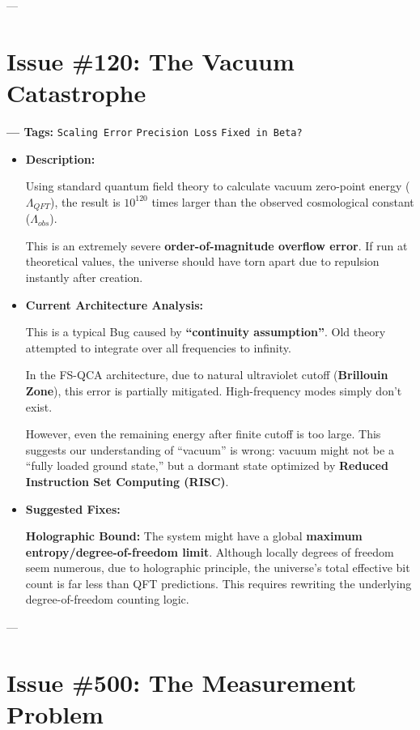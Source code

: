 \documentclass[11pt,a4paper,twoside]{book}
\begin{document}
---

\section{Issue \#120: The Vacuum Catastrophe}

\textbf{--- Tags:} \texttt{Scaling Error} \texttt{Precision Loss} \texttt{Fixed in Beta?}

\begin{itemize}
\item \textbf{Description:}

Using standard quantum field theory to calculate vacuum zero-point energy (\textbf{$\Lambda_{QFT}$}), the result is \textbf{$10^{120}$} times larger than the observed cosmological constant (\textbf{$\Lambda_{obs}$}).

This is an extremely severe \textbf{order-of-magnitude overflow error}. If run at theoretical values, the universe should have torn apart due to repulsion instantly after creation.

\item \textbf{Current Architecture Analysis:}

This is a typical Bug caused by \textbf{``continuity assumption''}. Old theory attempted to integrate over all frequencies to infinity.

In the FS-QCA architecture, due to natural ultraviolet cutoff (\textbf{Brillouin Zone}), this error is partially mitigated. High-frequency modes simply don't exist.

However, even the remaining energy after finite cutoff is too large. This suggests our understanding of ``vacuum'' is wrong: vacuum might not be a ``fully loaded ground state,'' but a dormant state optimized by \textbf{Reduced Instruction Set Computing (RISC)}.

\item \textbf{Suggested Fixes:}

\textbf{Holographic Bound:} The system might have a global \textbf{maximum entropy/degree-of-freedom limit}. Although locally degrees of freedom seem numerous, due to holographic principle, the universe's total effective bit count is far less than QFT predictions. This requires rewriting the underlying degree-of-freedom counting logic.
\end{itemize}

---

\section{Issue \#500: The Measurement Problem}
\end{document}
